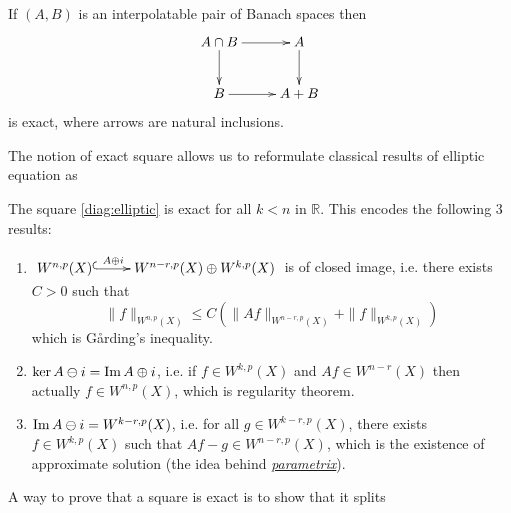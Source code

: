 \begin{exampl}
If \((A,B)\) is an interpolatable pair of Banach spaces then
\[
 \xymatrix{
A\cap B \ar@{->}[d] \ar@{->}[r] & A \ar@{->}[d] \\
B \ar@{->}[r] & A+B
}
\]
is exact, where arrows are natural inclusions.
\end{exampl}

The notion of exact square allows us to reformulate classical results of elliptic
equation as

\begin{theorem}
\label{thm:elliptic-const}
The square \eqref{diag:elliptic} is exact for all \(k < n\) in \(\mathbb{R}\). This encodes the
following 3 results:
\begin{enumerate}
\item \(\xymatrix{
   W^{n,p}(X) \ar@{^{(}->}[r]^<<<<<{A\oplus i} & W^{n-r,p}(X)\oplus W^{k,p}(X)
   }\) is of closed image, i.e. there exists \(C>0\) such that
\[
    \|f\|_{W^{n,p}(X)}\leq C \left( \|A f\|_{W^{n-r,p}(X)} +\|f\|_{W^{k,p}(X)}  \right)
   \]
 which is Gårding's inequality.
\item \(\ker A\ominus i = \mathop{\rm Im}\nolimits A\oplus i\), i.e. if \(f\in W^{k,p}(X)\) and \(Af\in
   W^{n-r}(X)\) then actually \(f\in W^{n,p}(X)\), which is regularity theorem.
\item \(\mathop{\rm Im}\nolimits A\ominus i = W^{k-r,p}(X)\), i.e. for all \(g\in W^{k-r,p}(X)\), there exists
\(f\in W^{k,p}(X)\) such that \(Af - g\in W^{n-r,p}(X)\), which is the existence of
approximate solution (the idea behind \href{./green-function.org}{\emph{parametrix}}).
\end{enumerate}
\end{theorem}

A way to prove that a square is exact is to show that it splits

